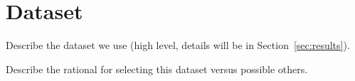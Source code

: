 \section{Dataset}
\label{sec:dataset}

Describe the dataset we use (high level, details will be in Section~\ref{sec:results}).

Describe the rational for selecting this dataset versus possible others.

